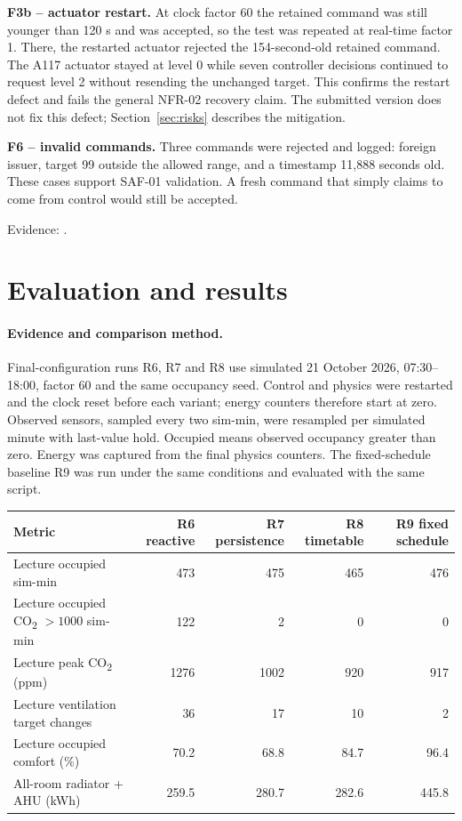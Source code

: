 \documentclass[11pt,a4paper]{article}
\begin{document}
\textbf{F3b -- actuator restart.} At clock factor 60 the retained command was still younger than 120 s and was accepted, so the test was repeated at real-time factor 1. There, the restarted actuator rejected the 154-second-old retained command. The A117 actuator stayed at level 0 while seven controller decisions continued to request level 2 without resending the unchanged target. This confirms the restart defect and fails the general NFR-02 recovery claim. The submitted version does not fix this defect; Section~\ref{sec:risks} describes the mitigation.

\textbf{F6 -- invalid commands.} Three commands were rejected and logged: foreign issuer, target 99 outside the allowed range, and a timestamp 11,888 seconds old. These cases support SAF-01 validation. A fresh command that simply claims to come from control would still be accepted.

Evidence: \protect{}.

\section{Evaluation and results}
\label{sec:results}
\paragraph{Evidence and comparison method.}
Final-configuration runs R6, R7 and R8 use simulated 21 October 2026, 07:30--18:00, factor 60 and the same occupancy seed. Control and physics were restarted and the clock reset before each variant; energy counters therefore start at zero. Observed sensors, sampled every two sim-min, were resampled per simulated minute with last-value hold. Occupied means observed occupancy greater than zero. Energy was captured from the final physics counters. The fixed-schedule baseline R9 was run under the same conditions and evaluated with the same script.

\noindent\begin{tabularx}{\linewidth}{Xrrrr}\toprule Metric & R6 reactive & R7 persistence & R8 timetable & R9 fixed schedule\\\midrule
Lecture occupied sim-min & 473 & 475 & 465 & 476\\
Lecture occupied CO\textsubscript{2} $>1000$ sim-min & 122 & 2 & 0 & 0\\
Lecture peak CO\textsubscript{2} (ppm) & 1276 & 1002 & 920 & 917\\
Lecture ventilation target changes & 36 & 17 & 10 & 2\\
Lecture occupied comfort (\%) & 70.2 & 68.8 & 84.7 & 96.4\\
All-room radiator + AHU (kWh) & 259.5 & 280.7 & 282.6 & 445.8\\\bottomrule\end{tabularx}
\end{document}
